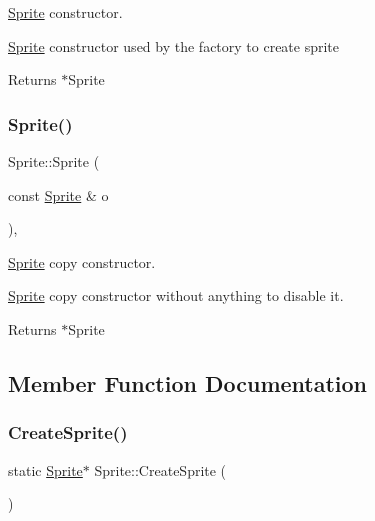 \hyperlink{class_sprite}{Sprite} constructor. 

\hyperlink{class_sprite}{Sprite} constructor used by the factory to create sprite

\begin{DoxyReturn}{Returns}
$\ast$\+Sprite 
\end{DoxyReturn}
\mbox{\label{class_sprite_aa5cb9fac0cfa5d81dc429e75137179d0}} 
\subsubsection{\texorpdfstring{Sprite()}{Sprite()}\hspace{0.1cm}{\footnotesize\ttfamily [2/2]}}
{\footnotesize\ttfamily Sprite\+::\+Sprite (\begin{DoxyParamCaption}\item[{const \hyperlink{class_sprite}{Sprite} \&}]{o }\end{DoxyParamCaption})\hspace{0.3cm}{\ttfamily [inline]}, {\ttfamily [protected]}}



\hyperlink{class_sprite}{Sprite} copy constructor. 

\hyperlink{class_sprite}{Sprite} copy constructor without anything to disable it.

\begin{DoxyReturn}{Returns}
$\ast$\+Sprite 
\end{DoxyReturn}


\subsection{Member Function Documentation}
\mbox{\label{class_sprite_aaabea785dc01ff0246b290fc9e6b3f62}} 
\subsubsection{\texorpdfstring{Create\+Sprite()}{CreateSprite()}}
{\footnotesize\ttfamily static \hyperlink{class_sprite}{Sprite}$\ast$ Sprite\+::\+Create\+Sprite (\begin{DoxyParamCaption}{ }\end{DoxyParamCaption})\hspace{0.3cm}{\ttfamily [static]}}



